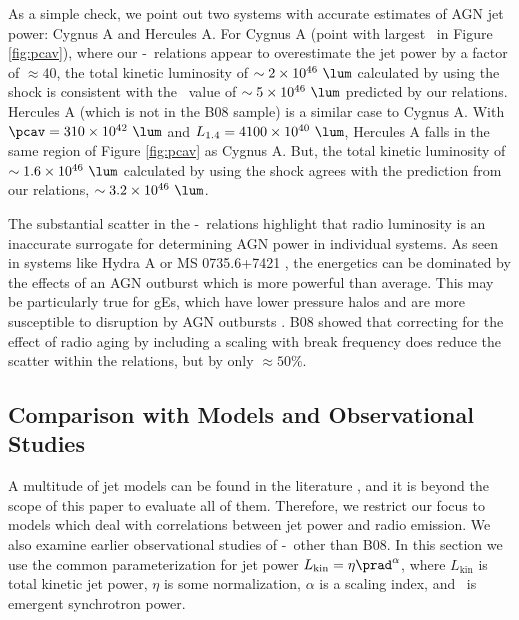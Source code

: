\documentclass{emulateapj}
\begin{document}
As a simple check, we point out two systems with accurate estimates of
AGN jet power: Cygnus A and Hercules A. For Cygnus A (point with
largest \prad\ in Figure \ref{fig:pcav}), where our
\pjet-\prad\ relations appear to overestimate the jet power by
a factor of $\approx 40$, the total kinetic luminosity of $\sim
2\times10^{46} ~\lum$ calculated by \citet{2006ApJ...644L...9W} using
the shock is consistent with the \pjet\ value of $\sim 5\times10^{46}
~\lum$ predicted by our relations. Hercules A (which is not in the B08
sample) is a similar case to Cygnus A. With $\pcav = 310\times10^{42}
~\lum$ and $\phigh = 4100\times10^{40} ~\lum$, Hercules A falls in the
same region of Figure \ref{fig:pcav} as Cygnus A. But, the total
kinetic luminosity of $\sim 1.6\times10^{46} ~\lum$ calculated by
\citet{herca} using the shock agrees with the prediction from our
relations, $\sim 3.2\times10^{46} ~\lum$.

The substantial scatter in the \pjet-\prad\ relations highlight that
radio luminosity is an inaccurate surrogate for determining AGN power
in individual systems. As seen in systems like Hydra A \citep{hydraa}
or MS 0735.6+7421 \citep{ms0735}, the energetics can be dominated by
the effects of an AGN outburst which is more powerful than
average. This may be particularly true for gEs, which have lower
pressure halos and are more susceptible to disruption by AGN outbursts
\citep{2006MNRAS.372.1161W, 2008ApJ...687L..53P}. B08 showed
that correcting for the effect of radio aging by including a scaling
with break frequency does reduce the scatter within the relations, but
by only $\approx 50\%$.

\subsection{Comparison with Models and Observational Studies}
\label{sec:models}

A multitude of jet models can be found in the literature \citep[\ie][]{1973MNRAS.164..243L, 1974MNRAS.166..513S,
1974MNRAS.169..395B, 1989ApJ...345L..21B, 2002ApJS..141..337C,
2002ApJS..141..371C}, and it is beyond the scope of this paper to evaluate all
of them.  Therefore, we restrict our focus to models which
deal with correlations between jet power and radio
emission. We also examine earlier observational studies of
\pjet-\prad\ other than B08. In this section we use the common
parameterization for jet power $L_{\mathrm{kin}} = \eta
\prad^{\alpha}$, where $L_{\mathrm{kin}}$ is total kinetic jet power,
$\eta$ is some normalization, $\alpha$ is a scaling index, and \prad\
is emergent synchrotron power.
\end{document}

